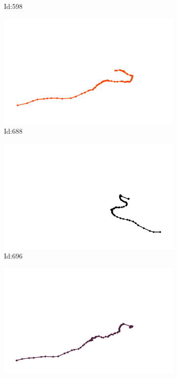 \documentclass[12pt,twoside]{report}
\begin{document}
\begin{figure}
\begin{subfigure}[b]{0.20\textwidth}
\caption{Id:598}
\end{subfigure}
\begin{subfigure}[b]{0.20\textwidth}
\centering
\includegraphics[width=\textwidth]{../../trajectories/688.png}
\caption{Id:688}
\end{subfigure}
\begin{subfigure}[b]{0.20\textwidth}
\centering
\includegraphics[width=\textwidth]{../../trajectories/696.png}
\caption{Id:696}
\end{subfigure}
\begin{subfigure}[b]{0.20\textwidth}
\centering
\includegraphics[width=\textwidth]{../../trajectories/753.png}

\end{subfigure}
\end{figure}
\end{document}
